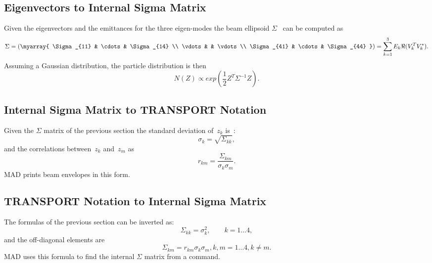 \subsection{Eigenvectors to Internal Sigma Matrix}
Given the eigenvectors and the emittances for the three eigen-modes the
beam ellipsoid $\Sigma$~\cite{SLAC75} can be computed as
\begin{equation}
\Sigma = \left(\myarray{
\Sigma_{11} & \cdots & \Sigma_{14} \\
\vdots      &        & \vdots \\
\Sigma_{41} & \cdots & \Sigma_{44}
}\right) =
\sum_{k=1}^3 E_k \Re (V_k^T V_k^*).
\end{equation}
Assuming a Gaussian distribution, the particle distribution is then
\begin{equation}
N(Z) \propto exp(\frac{1}{2} Z^T \Sigma^{-1} Z).
\end{equation}
 
\subsection{Internal Sigma Matrix to TRANSPORT Notation}
Given the $\Sigma$ matrix of the previous section the standard
deviation of~$z_k$ is~\cite{SLAC75}:
\begin{equation}
\sigma_k = \sqrt{\Sigma_{kk}},
\end{equation}
and the correlations between~$z_k$ and~$z_m$ as
\begin{equation}
r_{km} = \frac{\Sigma_{km}}{\sigma_k \sigma_m}.
\end{equation}
MAD prints beam envelopes in this form.
 
\subsection{TRANSPORT Notation to Internal Sigma Matrix}
The formulas of the previous section can be inverted as:
\begin{equation}
\Sigma_{kk} = \sigma_k^2, \qquad k = 1 \ldots 4,
\end{equation}
and the off-diagonal elements are
\begin{equation}
\Sigma_{km} = r_{km} \sigma_k \sigma_m, k, m = 1 \ldots 4, k \neq m.
\end{equation}
MAD uses this formula to find the internal $\Sigma$ matrix from a
 command.
 
